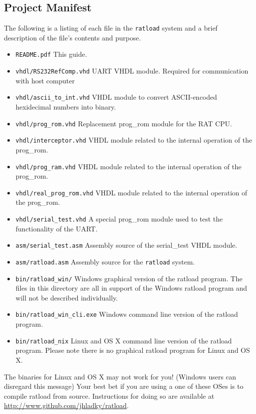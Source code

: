 \documentclass[notitlepage]{article}
\newcommand{\infosign}{\fontencoding{U}\fontfamily{futs}\huge\selectfont\char 116\relax}
\begin{document}
\subsection{Project Manifest}
The following is a listing of each file in the \texttt{ratload} system and a brief description of the file's contents and purpose.
\begin{itemize}
\item \texttt{README.pdf} This guide.
\item \texttt{vhdl/RS232RefComp.vhd} UART VHDL module. Required for communication with host computer
\item \texttt{vhdl/ascii\_to\_int.vhd} VHDL module to convert ASCII-encoded hexidecimal numbers into binary.
\item \texttt{vhdl/prog\_rom.vhd} Replacement prog\_rom module for the RAT CPU.
\item \texttt{vhdl/interceptor.vhd} VHDL module related to the internal operation of the prog\_rom.
\item \texttt{vhdl/prog\_ram.vhd} VHDL module related to the internal operation of the prog\_rom.
\item \texttt{vhdl/real\_prog\_rom.vhd} VHDL module related to the internal operation of the prog\_rom.
\item \texttt{vhdl/serial\_test.vhd} A special prog\_rom module used to test the functionality of the UART.
\item \texttt{asm/serial\_test.asm} Assembly source of the serial\_test VHDL module.
\item \texttt{asm/ratload.asm} Assembly source for the \texttt{ratload} system.
\item \texttt{bin/ratload\_win/} Windows graphical version of the ratload program. The files in this directory are all in support of the Windows ratload program and will not be described individually.
\item \texttt{bin/ratload\_win\_cli.exe} Windows command line version of the ratload program.
\item \texttt{bin/ratload\_nix} Linux and OS X command line version of the ratload program. Please note there is no graphical ratload program for Linux and OS X.
\end{itemize}

\begin{infobox}
  {\infosign} The binaries for Linux and OS X may not work for you! (Windows users can disregard this message) Your best bet if you are using a one of these OSes is to compile ratload from source. Instructions for doing so are available at \url{http://www.github.com/jhladky/ratload}.
\end{infobox}
\end{document}
